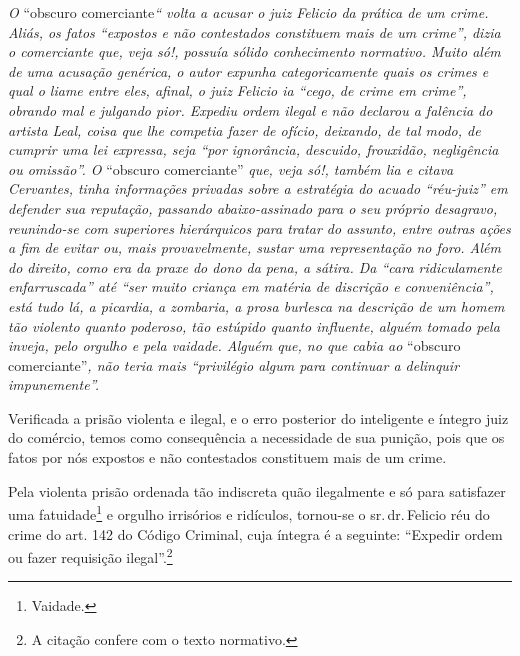\begin{didascalia}
\emph{O} ``obscuro comerciante\emph{`` volta a acusar o juiz Felicio da
prática de um crime. Aliás, os fatos ``expostos e não contestados
constituem mais de um crime'', dizia o comerciante que, veja só!, possuía
sólido conhecimento normativo. Muito além de uma acusação genérica, o
autor expunha categoricamente quais os crimes e qual o liame entre eles,
afinal, o juiz Felicio ia ``cego, de crime em crime'', obrando mal e
julgando pior. Expediu ordem ilegal e não declarou a falência do artista
Leal, coisa que lhe competia fazer de ofício, deixando, de tal modo, de
cumprir uma lei expressa, seja ``por ignorância, descuido, frouxidão,
negligência ou omissão''. O} ``obscuro comerciante'' \emph{que, veja só!,
também lia e citava Cervantes, tinha informações privadas sobre a
estratégia do acuado ``réu-juiz'' em defender sua reputação, passando
abaixo-assinado para o seu próprio desagravo, reunindo-se com superiores
hierárquicos para tratar do assunto, entre outras ações a fim de evitar
ou, mais provavelmente, sustar uma representação no foro. Além do
direito, como era da praxe do dono da pena, a sátira. Da ``cara
ridiculamente enfarruscada'' até ``ser muito criança em matéria de
discrição e conveniência'', está tudo lá, a picardia, a zombaria, a prosa
burlesca na descrição de um homem tão violento quanto poderoso, tão
estúpido quanto influente, alguém tomado pela inveja, pelo orgulho e
pela vaidade. Alguém que, no que cabia ao} ``obscuro comerciante''\emph{,
não teria mais ``privilégio algum para continuar a delinquir
impunemente''.}
\end{didascalia}

Verificada a prisão violenta e ilegal, e o erro posterior do inteligente
e íntegro juiz do comércio, temos como consequência a necessidade de sua
punição, pois que os fatos por nós expostos e não contestados constituem
mais de um crime.

Pela violenta prisão ordenada tão indiscreta quão ilegalmente e só para
satisfazer uma fatuidade\footnote{ Vaidade.} e orgulho irrisórios e
ridículos, tornou-se o sr.\,dr.\,Felicio réu do crime do art. 142 do
Código Criminal, cuja íntegra é a seguinte: ``Expedir ordem ou fazer
requisição ilegal''.\footnote{ A citação confere com o texto normativo.}

